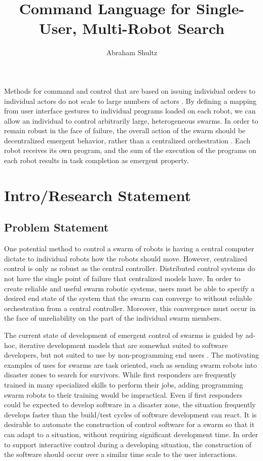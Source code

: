 \documentclass[]{article}
\title{Command Language for Single-User, Multi-Robot Search}
\author{Abraham Shultz}
\begin{document}
\maketitle

\begin{abstract}

\end{abstract}

Methods for command and control that are based on issuing individual orders to individual actors do not scale to large numbers of actors . 
By defining a mapping from user interface gestures to individual programs loaded on each robot, we can allow an individual to control arbitrarily large, heterogeneous swarms.
In order to remain robust in the face of failure, the overall action of the swarm should be decentralized emergent behavior, rather than a centralized orchestration . 
Each robot receives its own program, and the sum of the execution of the programs on each robot results in task completion as emergent property.

\section{Intro/Research Statement}

\subsection{Problem Statement}

One potential method to control a swarm of robots is having a central computer dictate to individual robots how the robots should move.
However, centralized control is only as robust as the central controller. 
Distributed control systems do not have the single point of failure that centralized models have. 
In order to create reliable and useful swarm robotic systems, users must be able to specify a desired end state of the system that the swarm can converge to without reliable orchestration from a central controller. 
Moreover, this convergence must occur in the face of unreliability on the part of the individual swarm members. 

The current state of development of emergent control of swarms is guided by ad-hoc, iterative development models that are somewhat suited to software developers, but not suited to use by non-programming end users \cite{palmer2005behavioral}.
The motivating examples of uses for swarms are task oriented, such as sending swarm robots into disaster zones to search for survivors. 
While first responders are frequently trained in many specialized skills to perform their jobs, adding programming swarm robots to their training would be impractical. 
Even if first responders could be expected to develop software in a disaster zone, the situation frequently develops faster than the build/test cycles of software development can react. 
It is desirable to automate the construction of control software for a swarm so that it can adapt to a situation, without requiring significant development time. 
In order to support interactive control during a developing situation, the construction of the software should occur over a similar time scale to the user interactions. 
\end{document}
